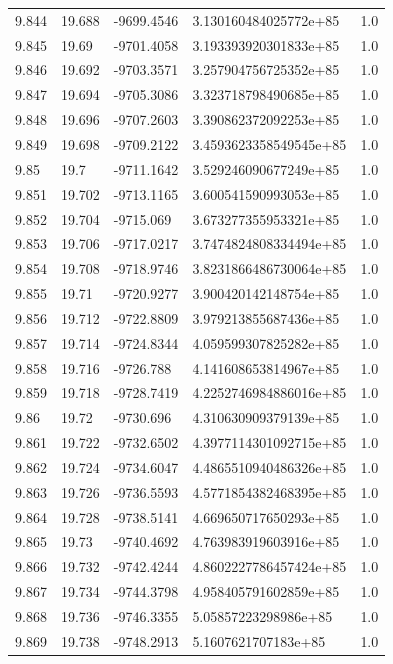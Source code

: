 \begin{tabular}{lllll}
9.844 & 19.688 & -9699.4546 & 3.130160484025772e+85 & 1.0 \\
9.845 & 19.69 & -9701.4058 & 3.193393920301833e+85 & 1.0 \\
9.846 & 19.692 & -9703.3571 & 3.257904756725352e+85 & 1.0 \\
9.847 & 19.694 & -9705.3086 & 3.323718798490685e+85 & 1.0 \\
9.848 & 19.696 & -9707.2603 & 3.390862372092253e+85 & 1.0 \\
9.849 & 19.698 & -9709.2122 & 3.4593623358549545e+85 & 1.0 \\
9.85 & 19.7 & -9711.1642 & 3.529246090677249e+85 & 1.0 \\
9.851 & 19.702 & -9713.1165 & 3.600541590993053e+85 & 1.0 \\
9.852 & 19.704 & -9715.069 & 3.673277355953321e+85 & 1.0 \\
9.853 & 19.706 & -9717.0217 & 3.7474824808334494e+85 & 1.0 \\
9.854 & 19.708 & -9718.9746 & 3.8231866486730064e+85 & 1.0 \\
9.855 & 19.71 & -9720.9277 & 3.900420142148754e+85 & 1.0 \\
9.856 & 19.712 & -9722.8809 & 3.979213855687436e+85 & 1.0 \\
9.857 & 19.714 & -9724.8344 & 4.059599307825282e+85 & 1.0 \\
9.858 & 19.716 & -9726.788 & 4.141608653814967e+85 & 1.0 \\
9.859 & 19.718 & -9728.7419 & 4.2252746984886016e+85 & 1.0 \\
9.86 & 19.72 & -9730.696 & 4.310630909379139e+85 & 1.0 \\
9.861 & 19.722 & -9732.6502 & 4.3977114301092715e+85 & 1.0 \\
9.862 & 19.724 & -9734.6047 & 4.4865510940486326e+85 & 1.0 \\
9.863 & 19.726 & -9736.5593 & 4.5771854382468395e+85 & 1.0 \\
9.864 & 19.728 & -9738.5141 & 4.669650717650293e+85 & 1.0 \\
9.865 & 19.73 & -9740.4692 & 4.763983919603916e+85 & 1.0 \\
9.866 & 19.732 & -9742.4244 & 4.8602227786457424e+85 & 1.0 \\
9.867 & 19.734 & -9744.3798 & 4.958405791602859e+85 & 1.0 \\
9.868 & 19.736 & -9746.3355 & 5.05857223298986e+85 & 1.0 \\
9.869 & 19.738 & -9748.2913 & 5.1607621707183e+85 & 1.0 \\

\end{tabular}
